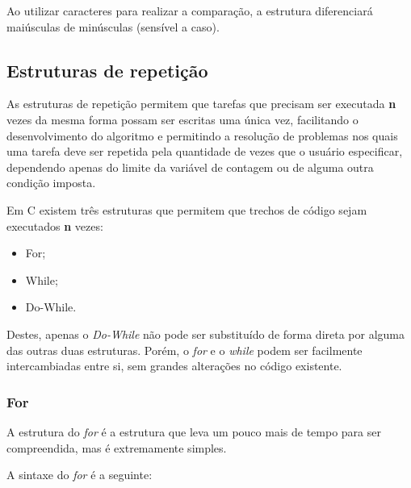 \documentclass[12pt]{article}
\newcommand\tab[1][1cm]{\hspace*{#1}}
\begin{document}
\hspace{0.25cm}
\begin{tcolorbox}[colback=yellow!5!white,colframe=yellow!75!black,title=Atenção!]
  \par\tab Ao utilizar caracteres para realizar a comparação, a estrutura diferenciará maiúsculas de minúsculas (sensível a caso).
\end{tcolorbox}

\newpage

\subsection{Estruturas de repetição}

\par\tab As estruturas de repetição permitem que tarefas que precisam ser executada \textbf{n} vezes da mesma forma possam ser escritas uma única vez, facilitando o desenvolvimento do algoritmo e permitindo a resolução de problemas nos quais uma tarefa deve ser repetida pela quantidade de vezes que o usuário especificar, dependendo apenas do limite da variável de contagem ou de alguma outra condição imposta.

\par\tab Em C existem três estruturas que permitem que trechos de código sejam executados \textbf{n} vezes:
\begin{itemize}
    \item For;
    \item While;
    \item Do-While.
\end{itemize}

\par\tab Destes, apenas o \textit{Do-While} não pode ser substituído de forma direta por alguma das outras duas estruturas. Porém, o \textit{for} e o \textit{while} podem ser facilmente intercambiadas entre si, sem grandes alterações no código existente.

\subsubsection{For}

\par\tab A estrutura do \textit{for} é a estrutura que leva um pouco mais de tempo para ser compreendida, mas é extremamente simples.

\par\tab A sintaxe do \textit{for} é a seguinte:
\end{document}
